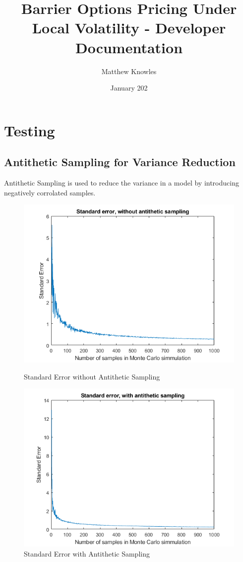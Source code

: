 \documentclass[11pt]{amsart}
\title{Barrier Options Pricing Under Local Volatility - Developer Documentation}
\author{Matthew Knowles}
\date{January 202}
\begin{document}
\maketitle

\section{Testing}

\subsection{Antithetic Sampling for Variance Reduction}
Antithetic Sampling is used to reduce the variance in a model by introducing negatively corrolated samples. 

\begin{figure}[h]
    \centering
    \begin{minipage}{0.4\textwidth}
        \centering
        \includegraphics[width=1.1\textwidth]{StandardError.png}
        \caption{Standard Error without Antithetic Sampling}
    \end{minipage}
    \begin{minipage}{0.4\textwidth}
        \centering
        \includegraphics[width=1.1\textwidth]{StandardErrorAT.png}
        \caption{Standard Error with Antithetic Sampling}
    \end{minipage}
\end{figure}
\end{document}
